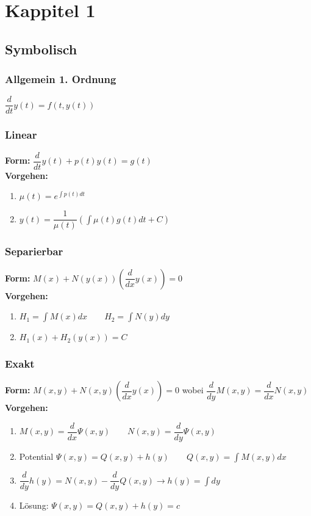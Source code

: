 \section{Kappitel 1}

\subsection{Symbolisch}

\subsubsection{Allgemein 1. Ordnung}
$\dfrac{d}{dt}y(t)=f(t,y(t))$

\subsubsection{Linear}

\textbf{Form:} $\dfrac{d}{dt}y(t) +p(t)y(t)=g(t)$ \\

\textbf{Vorgehen:}
\begin{enumerate}
\item $\mu(t)=e^{\int p(t)dt}$
\item $y(t)=\dfrac{1}{\mu(t)}\left(\int{\mu(t)g(t) dt+C}\right)$
\end{enumerate}


\subsubsection{Separierbar}

\textbf{Form:} $M(x)+N(y(x))(\dfrac{d}{dx}y(x))=0$\\

\textbf{Vorgehen:}
\begin{enumerate}
\item $H_1=\int M(x)dx \qquad H_2=\int N(y)dy$
\item $H_1(x) + H_2(y(x)) = C$
\end{enumerate}

\subsubsection{Exakt}
\textbf{Form:} $M(x,y) + N(x,y)(\dfrac{d}{dx}y(x))=0$ 
\quad wobei \quad $\dfrac{d}{dy}M(x,y) = \dfrac{d}{dx}N(x,y)$\\

\textbf{Vorgehen:}
\begin{enumerate}
\item $ M(x,y) = \dfrac{d}{dx}\Psi(x,y) \qquad N(x,y) = \dfrac{d}{dy}\Psi(x,y) $
\item Potential $\Psi(x,y) = Q(x,y) + h(y) \qquad Q(x,y) = \int M(x,y) dx$
\item $\dfrac{d}{dy}h(y) = N(x,y) - \dfrac{d}{dy}Q(x,y) \rightarrow h(y)=\int dy$
\item Lösung: $\Psi(x,y) = Q(x,y) + h(y) = c$
\end{enumerate}

